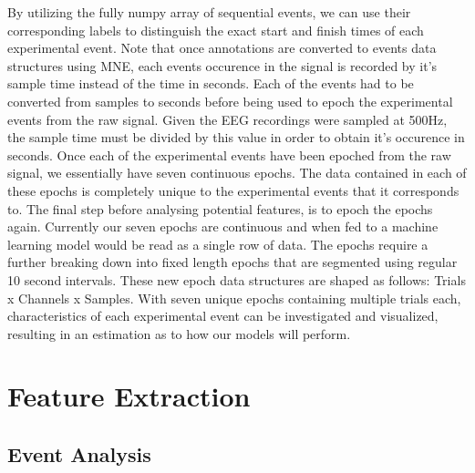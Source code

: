 \documentclass[11pt]{article}
\begin{document}
By utilizing the fully numpy array of sequential events, we can use their corresponding labels to distinguish the exact start and finish times of each experimental event. Note that once annotations are converted to events data structures using MNE, each events occurence in the signal is recorded by it's sample time instead of the time in seconds. Each of the events had to be converted from samples to seconds before being used to epoch the experimental events from the raw signal. Given the EEG recordings were sampled at 500Hz, the sample time must be divided by this value in order to obtain it's occurence in seconds. Once each of the experimental events have been epoched from the raw signal, we essentially have seven continuous epochs. The data contained in each of these epochs is completely unique to the experimental events that it corresponds to. The final step before analysing potential features, is to epoch the epochs again. Currently our seven epochs are continuous and when fed to a machine learning model would be read as a single row of data. The epochs require a further breaking down into fixed length epochs that are segmented using regular 10 second intervals. These new epoch data structures are shaped as follows: Trials x Channels x Samples. With seven unique epochs containing multiple trials each, characteristics of each experimental event can be investigated and visualized, resulting in an estimation as to how our models will perform. 


\section{Feature Extraction}

\subsection{Event Analysis}
\end{document}

